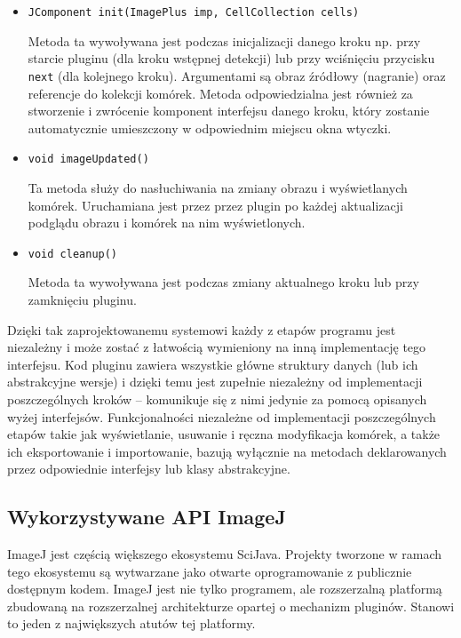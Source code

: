 \documentclass[declaration,shortabstract,mgr]{iithesis}
\begin{document}
\begin{itemize}

\item \texttt{JComponent init(ImagePlus imp, CellCollection cells)}

Metoda ta wywoływana jest podczas inicjalizacji danego kroku np. przy starcie pluginu (dla kroku wstępnej detekcji) lub przy wciśnięciu przycisku \texttt{next} (dla kolejnego kroku).
Argumentami są obraz źródłowy (nagranie) oraz referencje do kolekcji komórek.
Metoda odpowiedzialna jest również za stworzenie i zwrócenie komponent interfejsu danego kroku, który zostanie automatycznie umieszczony w odpowiednim miejscu okna wtyczki.

\item \texttt{void imageUpdated()}

Ta metoda służy do nasłuchiwania na zmiany obrazu i wyświetlanych komórek.
Uruchamiana jest przez przez plugin po każdej aktualizacji podglądu obrazu i komórek na nim wyświetlonych.

\item \texttt{void cleanup()}

Metoda ta wywoływana jest podczas zmiany aktualnego kroku lub przy zamknięciu pluginu.

\end{itemize}

Dzięki tak zaprojektowanemu systemowi każdy z etapów programu jest niezależny i może zostać z łatwością wymieniony na inną implementację tego interfejsu.
Kod pluginu zawiera wszystkie główne struktury danych (lub ich abstrakcyjne wersje) i dzięki temu jest zupełnie niezależny od implementacji poszczególnych kroków -- komunikuje się z nimi jedynie za pomocą opisanych wyżej interfejsów.
Funkcjonalności niezależne od implementacji poszczególnych etapów takie jak wyświetlanie, usuwanie i ręczna modyfikacja komórek, a także ich eksportowanie i importowanie, bazują wyłącznie na metodach deklarowanych przez odpowiednie interfejsy lub klasy abstrakcyjne.

\subsection{Wykorzystywane API ImageJ}

ImageJ jest częścią większego ekosystemu SciJava.
Projekty tworzone w ramach tego ekosystemu są wytwarzane jako otwarte oprogramowanie z publicznie dostępnym kodem.
ImageJ jest nie tylko programem, ale rozszerzalną platformą zbudowaną na rozszerzalnej architekturze opartej o mechanizm pluginów.
Stanowi to jeden z największych atutów tej platformy\cite{imagej:philosophy}.
\end{document}
